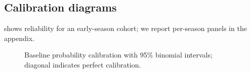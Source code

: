 \subsection{Calibration diagrams}
 shows reliability for an early-season cohort; we report per-season panels in the appendix.
\begin{figure}[t]
  \centering
  \caption[Baseline calibration]{Baseline probability calibration with 95\% binomial intervals; diagonal indicates perfect calibration.}
  \label{fig:baseline-reliability}
\end{figure}

